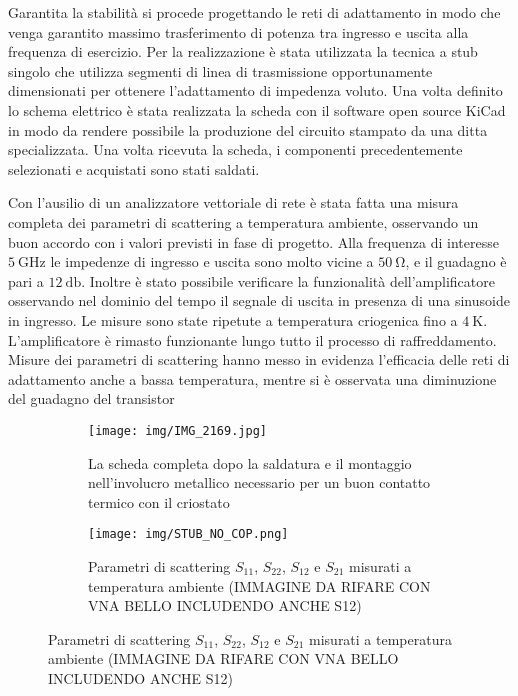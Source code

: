 \documentclass[12pt]{article}
\begin{document}
Garantita la stabilità si procede progettando le reti di adattamento in modo che venga garantito massimo trasferimento di potenza tra ingresso e uscita alla frequenza di esercizio. Per la realizzazione è stata utilizzata la tecnica a stub singolo che utilizza segmenti di linea di trasmissione opportunamente dimensionati per ottenere l'adattamento di impedenza voluto.
Una volta definito lo schema elettrico è stata realizzata la scheda con il software open source KiCad in modo da rendere possibile la produzione del circuito stampato da una ditta specializzata. Una volta ricevuta la scheda, i componenti precedentemente selezionati e acquistati sono stati saldati.

Con l'ausilio di un analizzatore vettoriale di rete è stata fatta una misura completa dei parametri di scattering a temperatura ambiente, osservando un buon accordo con i valori previsti in fase di progetto. Alla frequenza di interesse $\SI{5}{\giga\hertz}$ le impedenze di ingresso e uscita sono molto vicine a $\SI{50}{\ohm}$, e il guadagno è pari a $\SI{12}{\decibel}$. Inoltre è stato possibile verificare la funzionalità dell'amplificatore osservando nel dominio del tempo il segnale di uscita in presenza di una sinusoide in ingresso. Le misure sono state ripetute a temperatura criogenica fino a $\SI{4}{\kelvin}$. L'amplificatore è rimasto funzionante lungo tutto il processo di raffreddamento. Misure dei parametri di scattering hanno messo in evidenza l'efficacia delle reti di adattamento anche a bassa temperatura, mentre si è osservata una diminuzione del guadagno del transistor
\begin{figure}[H]
    \centering
    \begin{subfigure}[t]{0.45\textwidth}
        \centering
        \texttt{[image: img/IMG\_2169.jpg]}
        \caption{La scheda completa dopo la saldatura e il montaggio nell'involucro metallico necessario per un buon contatto termico con il criostato}
    \end{subfigure}
    \hfill
    \begin{subfigure}[t]{0.45\textwidth}
        \centering
        \texttt{[image: img/STUB\_NO\_COP.png]}
        \caption{Parametri di scattering $S_{11}$, $S_{22}$, $S_{12}$ e $S_{21}$ misurati a temperatura ambiente (IMMAGINE DA RIFARE CON VNA BELLO INCLUDENDO ANCHE S12)}
    \end{subfigure}
\end{figure}
\end{document}

